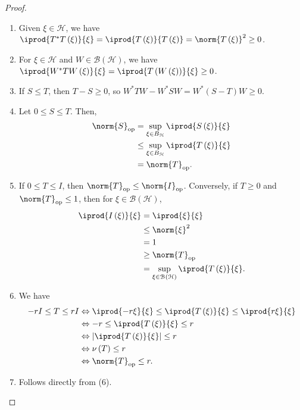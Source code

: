 \documentclass[10pt]{mypackage}
\begin{document}
\begin{proof}\hfill
  \begin{enumerate}[(1)]
    \item Given $\xi\in \mathcal{H}$, we have $ \iprod{T^{\ast}T\left(\xi\right)}{\xi} = \iprod{T\left(\xi\right)}{T\left(\xi\right)} = \norm{T\left(\xi\right)}^2 \geq 0 $.
    \item For $\xi\in \mathcal{H}$ and $W\in \mathcal{B}\left(\mathcal{H}\right)$, we have $ \iprod{W^{\ast}TW\left(\xi\right)}{\xi} = \iprod{T\left(W\left(\xi\right)\right)}{\xi} \geq 0$.
    \item If $S\leq T$, then $T - S \geq 0$, so $W^{\ast}TW - W^{\ast}SW = W^{\ast}\left(S-T\right)W \geq 0$.
    \item Let $0 \leq S \leq T$. Then,
      \begin{align*}
        \norm{S}_{\text{op}} &= \sup_{\xi\in B_{\mathcal{H}}} \iprod{S\left(\xi\right)}{\xi}\\
                             &\leq \sup_{\xi\in B_{\mathcal{H}}} \iprod{T\left(\xi\right)}{\xi}\\
                             &= \norm{T}_{\text{op}}.
      \end{align*}
    \item If $0 \leq T \leq I$, then $\norm{T}_{\text{op}}\leq \norm{I}_{\text{op}}$. Conversely, if $T\geq 0$ and $\norm{T}_{\text{op}}\leq 1$, then for $\xi\in \mathcal{B}\left(\mathcal{H}\right)$,
      \begin{align*}
        \iprod{I\left(\xi\right)}{\xi} &= \iprod{\xi}{\xi}\\
                                       &\leq \norm{\xi}^2\\
                                       &= 1\\
                                       &\geq \norm{T}_{\text{op}}\\
                                       &= \sup_{\xi\in \mathcal{B}\left(\mathcal{H}\right)} \iprod{T\left(\xi\right)}{\xi}.
      \end{align*}
    \item We have
      \begin{align*}
        -rI \leq T \leq rI &\Leftrightarrow \iprod{-r\xi}{\xi} \leq \iprod{T\left(\xi\right)}{\xi} \leq \iprod{r\xi}{\xi}\\
                           &\Leftrightarrow -r \leq \iprod{T\left(\xi\right)}{\xi} \leq r\\
                           &\Leftrightarrow \left\vert \iprod{T\left(\xi\right)}{\xi} \right\vert \leq r\\
                           &\Leftrightarrow \nu\left(T\right)\leq r\\
                           &\Leftrightarrow \norm{T}_{\text{op}}\leq r.
      \end{align*}
    \item Follows directly from (6).
  \end{enumerate}
\end{proof}
\end{document}
